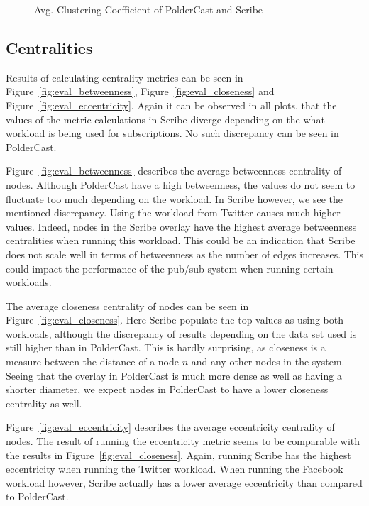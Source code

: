 \begin{figure}[H]
    \centering
    
    \caption{Avg. Clustering Coefficient of PolderCast and Scribe}
    \label{fig:eval_cc}
\end{figure}

\subsection{Centralities}

Results of calculating centrality metrics can be seen in
Figure~\ref{fig:eval_betweenness}, Figure~\ref{fig:eval_closeness} and
Figure~\ref{fig:eval_eccentricity}. Again it can be observed in all
plots, that the values of the metric calculations in Scribe diverge
depending on the what workload is being used for subscriptions. No such
discrepancy can be seen in PolderCast.

Figure~\ref{fig:eval_betweenness} describes the average betweenness
centrality of nodes. Although PolderCast have a high betweenness, the
values do not seem to fluctuate too much depending on the workload. In
Scribe however, we see the mentioned discrepancy. Using the workload
from Twitter causes much higher values. Indeed, nodes in the Scribe
overlay have the highest average betweenness centralities when running
this workload. This could be an indication that Scribe does not scale
well in terms of betweenness as the number of edges increases. This
could impact the performance of the pub/sub system when running certain
workloads.

The average closeness centrality of nodes can be seen in
Figure~\ref{fig:eval_closeness}. Here Scribe populate the top values as
using both workloads, although the discrepancy of results depending on
the data set used is still higher than in PolderCast. This is hardly
surprising, as closeness is a measure between the distance of a node
$n$ and any other nodes in the system. Seeing that the overlay in
PolderCast is much more dense as well as having a shorter diameter, we
expect nodes in PolderCast to have a lower closeness centrality as
well.

Figure~\ref{fig:eval_eccentricity} describes the average eccentricity
centrality of nodes. The result of running the eccentricity metric seems
to be comparable with the results in Figure~\ref{fig:eval_closeness}.
Again, running Scribe has the highest eccentricity when running the
Twitter workload. When running the Facebook workload however, Scribe
actually has a lower average eccentricity than compared to PolderCast.

